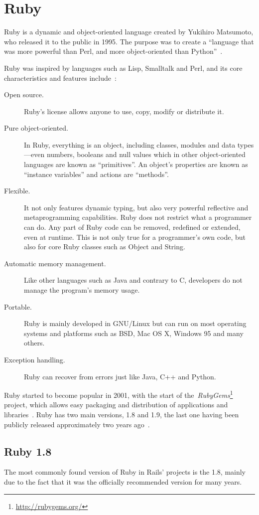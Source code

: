 \section{Ruby} %
\label{tech:sec:ruby}
Ruby is a dynamic and object-oriented language created by Yukihiro Matsumoto, who released it to the public in 1995. The purpose was to create a ``language that was more powerful than Perl, and more object-oriented than Python''~\cite{interview_creator_ruby}.

Ruby was inspired by languages such as Lisp, Smalltalk and Perl, and its core characteristics and features include~\cite{ruby_about, ruby_book}:
\begin{description}
  \item[Open source.] Ruby's license allows anyone to use, copy, modify or distribute it.
  \item[Pure object-oriented.] In Ruby, everything is an object, including classes, modules and data types---even numbers, booleans and null values which in other object-oriented languages are known as ``primitives''. An object's properties are known as ``instance variables'' and actions are ``methods''.
  \item[Flexible.] It not only features dynamic typing, but also very powerful reflective and metaprogramming capabilities. Ruby does not restrict what a programmer can do. Any part of Ruby code can be removed, redefined or extended, even at runtime. This is not only true for a programmer's own code, but also for core Ruby classes such as Object and String.
  \item[Automatic memory management.] Like other languages such as Java and contrary to C, developers do not manage the program's memory usage.
  \item[Portable.] Ruby is mainly developed in GNU/Linux but can run on most operating systems and platforms such as BSD, Mac OS X, Windows 95 and many others.
  \item[Exception handling.] Ruby can recover from errors just like Java, C++ and Python.
\end{description}
Ruby started to become popular in 2001, with the start of the~\textit{RubyGems}\footnote{\url{http://rubygems.org/}} project, which allows easy packaging and distribution of applications and libraries~\cite{railssolutions}. Ruby has two main versions, 1.8 and 1.9, the last one having been publicly released approximately two years ago~\cite{ruby191_release}.


\subsection{Ruby 1.8}
The most commonly found version of Ruby in Rails' projects is the 1.8, mainly due to the fact that it was the officially recommended version for many years.

